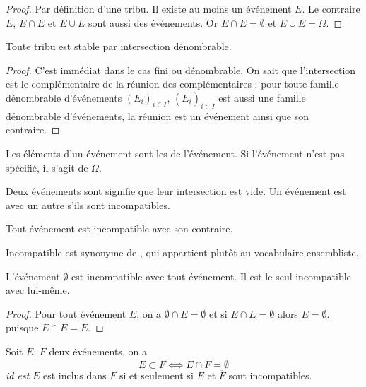 \begin{proof}
Par définition d'une tribu. Il existe au moins un événement \(𝐸\). Le contraire \(\overline{𝐸}\),
\(𝐸∩\overline{𝐸}\) et \(𝐸∪\overline{𝐸}\) sont aussi des événements. Or
\(𝐸∩\overline{𝐸}=∅\) et \(𝐸∪\overline{𝐸}=Ω\).
\end{proof}
\begin{theorem}
Toute tribu est stable par intersection dénombrable.
\end{theorem}
\begin{proof}
C'est immédiat dans le cas fini ou dénombrable. On sait que l'intersection est le complémentaire de la réunion des
complémentaires : pour toute famille dénombrable d'événements \((𝐸_{𝑖})_{𝑖∈𝐼}\), \((\overline{𝐸}_{𝑖})_{𝑖∈𝐼}\) est
aussi une famille dénombrable d'événements, la réunion est un événement ainsi que son contraire.
\end{proof}
\begin{definition}
Les éléments d'un événement sont les  de l'événement. Si l'événement n'est pas
spécifié, il s'agit de \(Ω\).
\end{definition}
\begin{definition}
Deux événements sont  signifie que leur intersection est vide. Un événement est
 avec un autre s'ils sont incompatibles.
\end{definition}
\begin{remark}
Tout événement est incompatible avec son contraire.
\end{remark}
\begin{terminology}
Incompatible est synonyme de , qui appartient plutôt au vocabulaire ensembliste.
\end{terminology}
\begin{theorem}
L'événement \(∅\) est incompatible avec tout événement. Il est le seul incompatible avec lui-même.
\end{theorem}
\begin{proof}
Pour tout événement \(𝐸\), on a \(\mathsf ∅∩𝐸= ∅\) et si \(𝐸∩𝐸=∅\) alors
\(𝐸=∅\). puisque \(𝐸∩𝐸=𝐸\).
\end{proof}
\begin{theorem}
Soit \(𝐸\), \(𝐹\) deux événements, on a
\begin{equation*}
𝐸⊂𝐹⟺𝐸∩\overline{𝐹}=∅
\end{equation*}
\emph{id est} \(𝐸\) est inclus dans \(𝐹\) si et seulement si \(𝐸\) et
\(\overline{𝐹}\) sont incompatibles.
\end{theorem}
